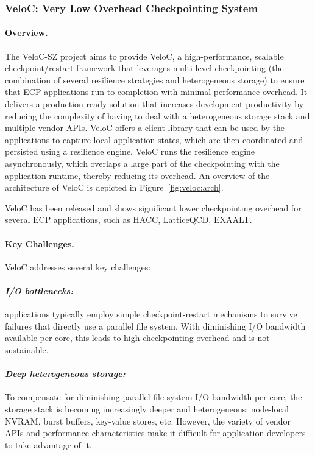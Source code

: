 \subsubsection{ VeloC: Very Low Overhead Checkpointing System}

\paragraph{Overview.}
The VeloC-SZ project aims to provide VeloC, a high-performance,
scalable checkpoint/restart framework that leverages multi-level
checkpointing (the combination of several resilience strategies and
heterogeneous storage) to ensure that ECP applications run to
completion with minimal performance overhead. It delivers a
production-ready solution that increases development productivity by
reducing the complexity of having to deal with a heterogeneous storage
stack and multiple vendor APIs. VeloC offers a client library that can
be used by the applications to capture local application states, which
are then coordinated and persisted using a resilience engine.  VeloC
runs the resilience engine asynchronously, which overlaps a large part
of the checkpointing with the application runtime, thereby reducing
its overhead. An overview of the architecture of VeloC is depicted
in Figure~\ref{fig:veloc:arch}.

VeloC has been released and shows significant lower checkpointing
overhead for several ECP applications, such as HACC, LatticeQCD,
EXAALT.

\paragraph{Key Challenges.}
VeloC addresses several key challenges:
\vspace{-1em}

\paragraph{\emph{I/O bottlenecks:}} applications typically employ
simple checkpoint-restart mechanisms to survive failures that directly
use a parallel file system. With diminishing I/O bandwidth available
per core, this leads to high checkpointing overhead and is not
sustainable.
\vspace{-1em}

\paragraph{\emph{Deep heterogeneous storage:}} To compensate for
diminishing parallel file system I/O bandwidth per core, the storage
stack is becoming increasingly deeper and heterogeneous: node-local
NVRAM, burst buffers, key-value stores, etc. However, the variety of
vendor APIs and performance characteristics make it difficult for
application developers to take advantage of it.
\vspace{-1em}


